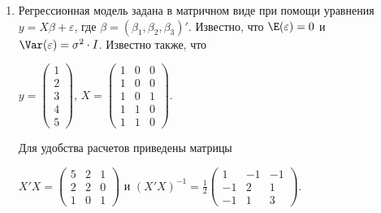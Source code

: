 \documentclass[pdftex,12pt,a4paper]{article}
\begin{document}
\begin{enumerate}
\item Регрессионная модель  задана в матричном виде при помощи уравнения $y=X\beta+\varepsilon$, где $\beta=(\beta_1,\beta_2,\beta_3)'$.
Известно, что $\E(\varepsilon)=0$  и  $\Var(\varepsilon)=\sigma^2\cdot I$.
Известно также, что 

$y=\left(
\begin{array}{c} 
1\\ 
2\\ 
3\\ 
4\\ 
5
\end{array}\right)$, 
$X=\left(\begin{array}{ccc}
1 & 0 & 0 \\
1 & 0 & 0 \\
1 & 0 & 1 \\
1 & 1 & 0 \\
1 & 1 & 0 
\end{array}\right)$.


Для удобства расчетов приведены матрицы 


$X'X=\left(
\begin{array}{ccc} 
5 & 2 & 1\\ 
2 & 2 & 0\\ 
1 & 0 & 1 
\end{array}\right)$ и $(X'X)^{-1}=\frac{1}{2}\left(
\begin{array}{ccc} 
1 & -1 & -1 \\
-1 & 2 & 1 \\
-1 & 1 & 3
\end{array}\right)$.


\end{enumerate}
\end{document}
